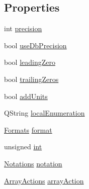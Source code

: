 \subsection*{Properties}
\begin{DoxyCompactItemize}
\item 
int \hyperlink{classQELineEdit_aab833120f7bc6e47e69da4c8ffb5c434}{precision}
\item 
bool \hyperlink{classQELineEdit_a208d85ec1cbb9f1326e1fc33e1af1a7c}{useDbPrecision}
\item 
bool \hyperlink{classQELineEdit_acdeda3df03354f255962dfe8b5c51ba6}{leadingZero}
\item 
bool \hyperlink{classQELineEdit_ac6073240cb58c420719d272e47dff6c6}{trailingZeros}
\item 
bool \hyperlink{classQELineEdit_ae9566b82c2f0fe4e445982721b7e1a80}{addUnits}
\item 
QString \hyperlink{classQELineEdit_a5177a3df7094ff270aa3fe7096875a98}{localEnumeration}
\item 
\hyperlink{classQELineEdit_aaf6d4da2e751180b9fc82e80d506812a}{Formats} \hyperlink{classQELineEdit_a898821256a4bab25580a3007fffa44c2}{format}
\item 
unsigned \hyperlink{classQELineEdit_adf8beec6661bba8c6a8a277c0dcd2bdd}{int}
\item 
\hyperlink{classQELineEdit_a8037a63e14b30d7fce853e4d32156c14}{Notations} \hyperlink{classQELineEdit_a496e07607a7a0b46c8d176fb627526fb}{notation}
\item 
\hyperlink{classQELineEdit_aed1607f3d06e29ed216cf5a7613415e1}{ArrayActions} \hyperlink{classQELineEdit_aae37b6857fe07e38e9c1b56496673a59}{arrayAction}
\end{DoxyCompactItemize}


